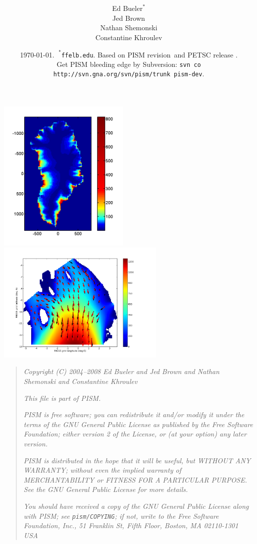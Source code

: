 \documentclass[11pt,final]{amsart}
\title[PISM User's Manual]{\protect{\Large \emph{PISM}, a Parallel Ice Sheet Model:\normalsize} \\ \protect{\Large \bigskip \bigskip User's Manual\normalsize}}
\author[]{Ed $\text{Bueler}^\ast$ \\ Jed Brown \\ Nathan Shemonski \\ Constantine Khroulev}
\date{\today.  $\phantom{|}^\ast$\texttt{ffelb\@@uaf.edu}.  Based on PISM revision \PISMREV\,and PETSC release \PETSCREV.  \\\tiny Get PISM bleeding edge by Subversion: \texttt{svn co http://svn.gna.org/svn/pism/trunk pism-dev}.}
\newcommand{\normalspacing}{\renewcommand{\baselinestretch}{1.1}\tiny\normalsize}
\begin{document}
\maketitle
\thispagestyle{empty}

\vspace{2.0in}
\begin{center}
\includegraphics[width=2.5in,keepaspectratio=true]{figs/greencbar_SSL2}\, \includegraphics[width=3.2in,keepaspectratio=true]{figs/rossquiver}
\end{center}

\newpage
\phantom{bob}
\vspace{2in}
\begin{quote}
\textsl{Copyright (C) 2004--2008 Ed Bueler and Jed Brown and Nathan Shemonski and Constantine Khroulev}
\medskip

\noindent \textsl{This file is part of PISM.}
\medskip

\noindent \textsl{PISM is free software; you can redistribute it and/or modify it under the terms of the GNU General Public License as published by the Free Software Foundation; either version 2 of the License, or (at your option) any later version.}
\medskip

\noindent \textsl{PISM is distributed in the hope that it will be useful, but WITHOUT ANY WARRANTY; without even the implied warranty of MERCHANTABILITY or FITNESS FOR A PARTICULAR PURPOSE.  See the GNU General Public License for more details.}
\medskip

\noindent \textsl{You should have received a copy of the GNU General Public License along with PISM; see \emph{\texttt{pism/COPYING}}; if not, write to the Free Software Foundation, Inc., 51 Franklin St, Fifth Floor, Boston, MA  02110-1301 USA}
\end{quote}
\vspace{1in}
\normalspacing
\end{document}
